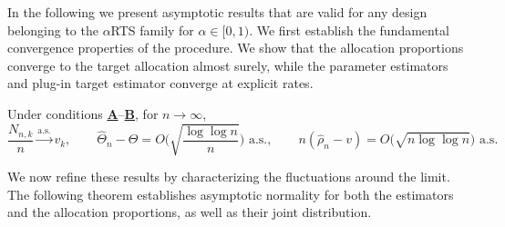In the following we present asymptotic results that are valid for any design belonging to the \(\alpha\)RTS family for \(\alpha \in [0,1)\). We first establish the fundamental convergence properties of the procedure. We show that the allocation proportions converge to the target allocation almost surely, while the parameter estimators and plug-in target estimator converge at explicit rates.

\begin{theorem}\label{thm:LLN}
	Under conditions \hyperlink{CA}{\textbf{A}}--\hyperlink{CB}{\textbf{B}}, for \(n \to \infty\),
	\[
	\frac{N_{n,k}}{n}\xrightarrow{\text{a.s.}}v_k,\qquad
	\hat\Theta_n-\Theta = O\!\Big(\sqrt{\frac{\log\log n}{n}}\Big)\text{ a.s.},\qquad
	n(\hat\rho_n-v)=O\!\big(\sqrt{n\log\log n}\big)\text{ a.s.}
	\]
\end{theorem}

%



We now refine these results by characterizing the fluctuations around the limit. The following theorem establishes asymptotic normality for both the estimators and the allocation proportions, as well as their joint distribution.

